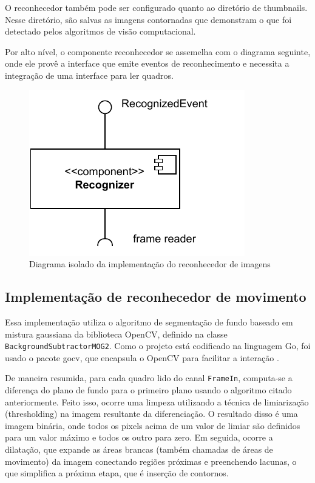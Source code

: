 \documentclass[12pt, %
openright, 
oneside, %
a4paper,    %
brazil]{facom-ufu-abntex2}
\begin{document}
O reconhecedor também pode ser configurado quanto ao diretório de thumbnails.
Nesse diretório, são salvas as imagens contornadas que demonstram o que foi
detectado pelos algoritmos de visão computacional.

Por alto nível, o componente reconhecedor se assemelha com o diagrama seguinte,
onde ele provê a interface que emite eventos de reconhecimento e necessita a
integração de uma interface para ler quadros.

\begin{figure}[!ht]
	\centering
	\includegraphics[width=0.4\linewidth]{recognizer.pdf}
	\caption[Diagrama isolado da implementação do reconhecedor de imagens]{Diagrama isolado da implementação do reconhecedor de imagens}
	\label{fig:graficosVariandoTamanhoRede}
\end{figure}

\subsection{Implementação de reconhecedor de movimento}
Essa implementação utiliza o algoritmo de segmentação de fundo baseado em
mistura gaussiana da biblioteca OpenCV, definido na classe
\texttt{BackgroundSubtractorMOG2}. Como o projeto está codificado na linguagem
Go, foi usado o pacote gocv, que encapsula o OpenCV para facilitar a interação
\cite{gocv_package}.

De maneira resumida, para cada quadro lido do canal \texttt{FrameIn},
computa-se a diferença do plano de fundo para o primeiro plano usando o
algoritmo citado anteriormente. Feito isso, ocorre uma limpeza utilizando a
técnica de limiarização (thresholding) na imagem resultante da diferenciação. O
resultado disso é uma imagem binária, onde todos os pixels acima de um valor de
limiar são definidos para um valor máximo e todos os outro para zero. Em
seguida, ocorre a dilatação, que expande as áreas brancas (também chamadas de
áreas de movimento) da imagem conectando regiões próximas e preenchendo
lacunas, o que simplifica a próxima etapa, que é inserção de contornos.
\end{document}
